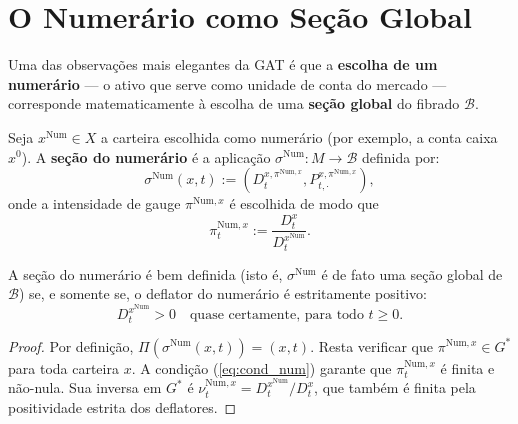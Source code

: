 \section{O Numer\'ario como Se\c{c}\~ao Global}

Uma das observa\c{c}\~oes mais elegantes da GAT \'e que a \textbf{escolha de
um numer\'ario} --- o ativo que serve como unidade de conta do mercado ---
corresponde matematicamente \`a escolha de uma \textbf{se\c{c}\~ao global} do
fibrado $\mathcal{B}$.

\begin{defi}\label{def:numeraire_section}
Seja $x^{\text{Num}} \in X$ a carteira escolhida como numer\'ario
(por exemplo, a conta caixa $x^0$). A \textbf{se\c{c}\~ao do numer\'ario}
\'e a aplica\c{c}\~ao $\sigma^{\text{Num}}: M \to \mathcal{B}$ definida por:
\begin{equation}\label{eq:num_section}
 \sigma^{\text{Num}}(x, t) := \left(D_t^{x, \pi^{\text{Num},x}},
 P_{t,\cdot}^{x, \pi^{\text{Num},x}}\right),
\end{equation}
onde a intensidade de gauge $\pi^{\text{Num},x}$ \'e escolhida de modo que
\begin{equation}\label{eq:pi_num}
 \pi_t^{\text{Num},x} := \frac{D_t^x}{D_t^{x^{\text{Num}}}}.
\end{equation}
\end{defi}

\begin{prop}\label{prop:boa_def}
A se\c{c}\~ao do numer\'ario \'e bem definida (isto \'e, $\sigma^{\text{Num}}$
\'e de fato uma se\c{c}\~ao global de $\mathcal{B}$) se, e somente se, o
deflator do numer\'ario \'e estritamente positivo:
\begin{equation}\label{eq:cond_num}
 D_t^{x^{\text{Num}}} > 0 \quad \text{quase certamente, para todo } t \geq 0.
\end{equation}
\end{prop}
\begin{proof}
Por defini\c{c}\~ao, $\Pi(\sigma^{\text{Num}}(x,t)) = (x,t)$. Resta verificar
que $\pi^{\text{Num},x} \in G^*$ para toda carteira $x$. A condi\c{c}\~ao
(\ref{eq:cond_num}) garante que $\pi_t^{\text{Num},x}$ \'e finita e n\~ao-nula.
Sua inversa em $G^*$ \'e $\nu_t^{\text{Num},x} = D_t^{x^{\text{Num}}} / D_t^x$,
que tamb\'em \'e finita pela positividade estrita dos deflatores.
\end{proof}

